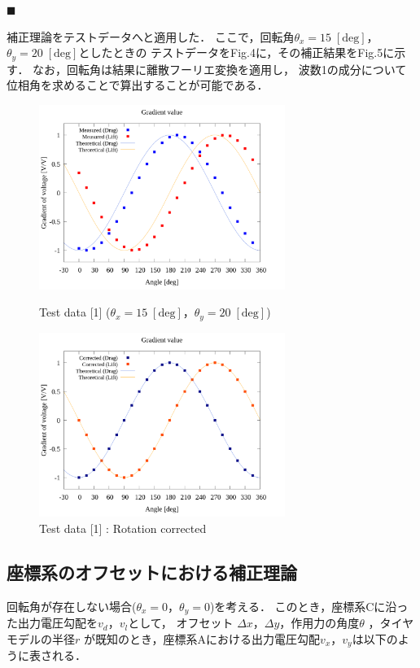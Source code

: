 \documentclass[twocolumn,a4j]{jsarticle}
\begin{document}
\noindent $\blacksquare$ 

補正理論をテストデータへと適用した．
ここで，回転角$\theta_x = 15\;\mathrm{[deg]}$，$\theta_y = 20\;\mathrm{[deg]}$としたときの
テストデータをFig.4に，その補正結果をFig.5に示す．
なお，回転角は結果に離散フーリエ変換を適用し，
波数1の成分について位相角を求めることで算出することが可能である．

\begin{figure}[htbp]
    \begin{center}
        \includegraphics[width=80mm]{../../../02_workspace/result/rotation_tx=15.0_ty=20.0/plot/20/20_adjust-value.png}
        \caption{Test data [1] ($\theta_x = 15\;\mathrm{[deg]}$，$\theta_y = 20\;\mathrm{[deg]}$)}
        \includegraphics[width=80mm]{../../../02_workspace/result/rotation_tx=15.0_ty=20.0/plot/21/21-4_summary.png}
        \caption{Test data [1] : Rotation corrected}
    \end{center}
\end{figure}

\subsection{座標系のオフセットにおける補正理論}
回転角が存在しない場合($\theta_x=0$，$\theta_y=0$)を考える．
このとき，座標系Cに沿った出力電圧勾配を$v_d$，$v_l$として，
オフセット $\Delta x$，$\Delta y$，作用力の角度$\theta$ ，タイヤモデルの半径$r$
が既知のとき，座標系Aにおける出力電圧勾配$v_x$，$v_y$は以下のように表される．
\end{document}
